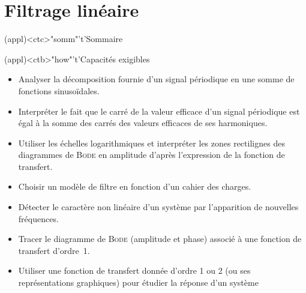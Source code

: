 \documentclass[../../main/main.tex]{subfiles}
\begin{document}
\setcounter{chapter}{7}


\chapter{Filtrage lin\'eaire}

\vspace*{\fill}

\begin{tcn}(appl)<ctc>"somm"'t'{Sommaire}
	\let\item\olditem
	\vspace{-15pt}
	\minitoc
	\vspace{-25pt}
\end{tcn}

\begin{tcn}[sidebyside,
		fontupper=\footnotesize, fontlower=\footnotesize
	](appl)<ctb>"how"'t'{Capacités exigibles}
	\begin{itemize}[label=\rcheck]
		\item Analyser la décomposition fournie d'un signal périodique en une
		      somme de fonctions sinusoïdales.
		\item Interpréter le fait que le carré de la valeur efficace d'un signal
		      périodique est égal à la somme des carrés des valeurs efficaces de
		      ses harmoniques.
		\item Utiliser les échelles logarithmiques et interpréter les zones
		      rectilignes des diagrammes de \textsc{Bode} en amplitude d'après
		      l'expression de la fonction de transfert.
		\item Choisir un modèle de filtre en fonction d'un cahier des charges.
		\item Détecter le caractère non linéaire d'un système par l'apparition de
		      nouvelles fréquences.
	\end{itemize}
	\tcblower
	\begin{itemize}[label=\rcheck]
		\item Tracer le diagramme de \textsc{Bode} (amplitude et phase)
		      associé à une fonction de transfert d'ordre~1.
		\item Utiliser une fonction de transfert donnée d'ordre 1 ou 2 (ou ses
		      représentations graphiques) pour étudier la réponse d'un système

\end{itemize}
\end{tcn}
\end{document}

